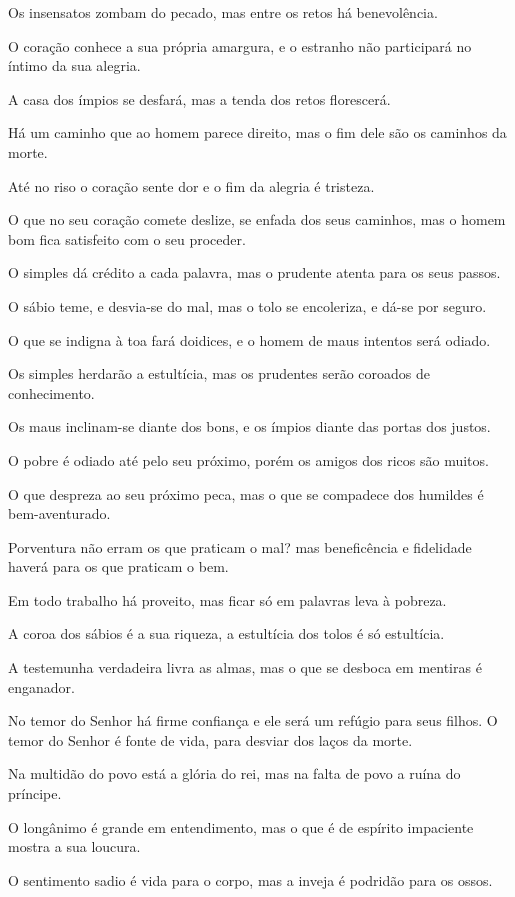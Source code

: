Os insensatos zombam do pecado, mas entre os retos há
benevolência.

O coração conhece a sua própria amargura, e o estranho não
participará no íntimo da sua alegria.

A casa dos ímpios se desfará, mas a tenda dos retos florescerá.

Há um caminho que ao homem parece direito, mas o fim dele são os
caminhos da morte.

Até no riso o coração sente dor e o fim da alegria é tristeza.

O que no seu coração comete deslize, se enfada dos seus caminhos,
mas o homem bom fica satisfeito com o seu proceder.

O simples dá crédito a cada palavra, mas o prudente atenta para
os seus passos.

O sábio teme, e desvia-se do mal, mas o tolo se encoleriza, e
dá-se por seguro.

O que se indigna à toa fará doidices, e o homem de maus intentos
será odiado.

Os simples herdarão a estultícia, mas os prudentes serão coroados
de conhecimento.

Os maus inclinam-se diante dos bons, e os ímpios diante das
portas dos justos.

O pobre é odiado até pelo seu próximo, porém os amigos dos ricos
são muitos.

O que despreza ao seu próximo peca, mas o que se compadece dos
humildes é bem-aventurado.

Porventura não erram os que praticam o mal? mas beneficência e
fidelidade haverá para os que praticam o bem.

Em todo trabalho há proveito, mas ficar só em palavras leva à
pobreza.

A coroa dos sábios é a sua riqueza, a estultícia dos tolos é só
estultícia.

A testemunha verdadeira livra as almas, mas o que se desboca em
mentiras é enganador.

No temor do Senhor há firme confiança e ele será um refúgio para
seus filhos. O temor do Senhor é fonte de vida, para desviar
dos laços da morte.

Na multidão do povo está a glória do rei, mas na falta de povo a
ruína do príncipe.

O longânimo é grande em entendimento, mas o que é de espírito
impaciente mostra a sua loucura.

O sentimento sadio é vida para o corpo, mas a inveja é podridão
para os ossos.

